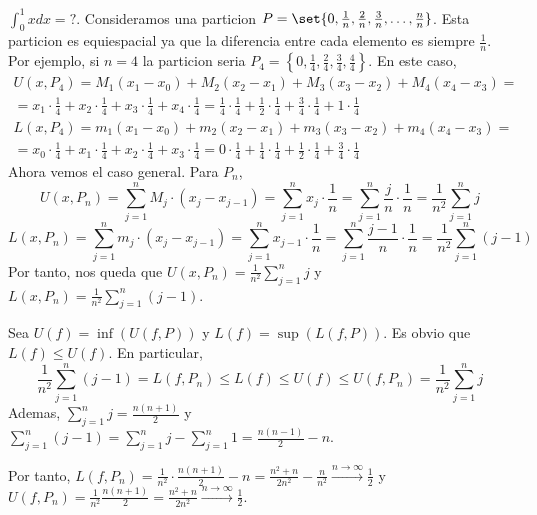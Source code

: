 \begin{example}
	\(\int^{1}_{0} x dx  = ? \). Consideramos una particion \(P = \set{0, \frac{1}{n}, \frac{2}{n}, \frac{3}{n}, \ldots, \frac{n}{n}}\). Esta particion es equiespacial ya que la diferencia entre cada elemento es siempre \(\frac{1}{n }\). Por ejemplo, si \(n = 4 \) la particion seria \(P_4 = \left \{0,\frac{1}{4}, \frac{2}{4}, \frac{3}{4}, \frac{4}{4}\right \}\). En este caso,
	\begin{multline*}
		U(x, P_4) = M_1 (x_1 - x_0) + M_2 (x_2 - x_1) + M_3(x_3 - x_2) + M_4 (x_4 - x_3) = \\ = x_1 \cdot \frac{1}{4} + x_2 \cdot \frac{1}{4} + x_3 \cdot \frac{1}{4} + x_4 \cdot \frac{1}{4} =  \frac{1}{4} \cdot \frac{1}{4} + \frac{1}{2} \cdot \frac{1}{4} + \frac{3}{4} \cdot \frac{1}{4} + 1 \cdot \frac{1}{4}
	\end{multline*}
	\begin{multline*}
		L(x, P_4) = m_1 (x_1 - x_0) + m_2 (x_2 - x_1) + m_3(x_3 - x_2) + m_4 (x_4 - x_3) = \\ = x_0 \cdot \frac{1}{4} + x_1 \cdot \frac{1}{4} + x_2 \cdot \frac{1}{4} + x_3 \cdot \frac{1}{4} =  0 \cdot \frac{1}{4} + \frac{1}{4} \cdot \frac{1}{4} + \frac{1}{2} \cdot \frac{1}{4} + \frac{3}{4} \cdot \frac{1}{4}
	\end{multline*}
	Ahora vemos el caso general. Para \(P_n \),
	\[
		U(x, P_n) = \sum_{j =1}^{n } M_j \cdot (x_j - x_{j-1}) = \sum_{j =1}^{n } x_j \cdot \frac{1}{n} = \sum_{j =1}^{n } \frac{j}{n} \cdot \frac{1}{n} = \frac{1}{n^{2} }  \sum_{j =1}^{n } j
	\]
	\[
		L(x, P_n) = \sum_{j =1}^{n } m_j \cdot (x_j - x_{j-1}) = \sum_{j =1}^{n } x_{j-1} \cdot \frac{1}{n} = \sum_{j =1}^{n } \frac{j-1}{n} \cdot \frac{1}{n} = \frac{1}{n^{2} }  \sum_{j =1}^{n } (j - 1)
	\]
	Por tanto, nos queda que \(U(x, P_n) = \frac{1}{n^{2} } \sum_{j =1}^{n } j\) y \(L(x,P_n) = \frac{1}{n^{2} } \sum_{j =1}^{n } (j - 1)\).
	
	Sea \(U(f) = \inf (U(f,P)) \) y \(L(f) = \sup (L(f,P ))\). Es obvio que \(L(f) \leq U(f )\). En particular,
	\[
		\frac{1}{n^{2} } \sum_{j =1}^{n } (j - 1) = L(f, P_n) \leq L(f) \leq U(f) \leq U(f,P_n) = \frac{1}{n^{2} } \sum_{j =1}^{n } j
	\]
	Ademas, \(\sum_{j =1}^{n } j = \frac{n (n + 1)}{2 }\) y \(\sum_{j =1}^{n } (j - 1) = \sum_{j=1}^{n} j - \sum_{j =1}^{n } 1 = \frac{n(n-1)}{2} - n \).
	
	Por tanto, \(L(f, P_n) = \frac{1}{n^{2} } \cdot \frac{n(n + 1)}{2} - n = \frac{n^{2} + n}{2n^{2} } - \frac{n }{n^{2} } \overset{n \rightarrow \infty}{\longrightarrow} \frac{1}{2}\) y \(U(f,P_n) = \frac{1}{n^{2} } \frac{n(n + 1)}{2} = \frac{n^{2} + n }{2n^{2} } \overset{n \rightarrow \infty}{\longrightarrow} \frac{1}{2}\).
	

\end{example}
